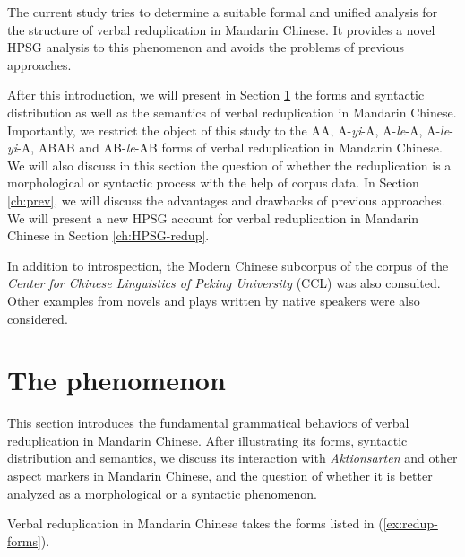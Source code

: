 \documentclass[11pt,a4paper,fleqn,draft]{article}
\begin{document}
The current study tries to determine a suitable formal and unified analysis for the structure of verbal reduplication in Mandarin Chinese.
It provides a novel HPSG analysis to this phenomenon and avoids the problems of previous approaches.

After this introduction, we will present in Section \ref{ch:phen} the forms and syntactic distribution as well as the semantics of verbal reduplication in Mandarin Chinese. 
Importantly, we restrict the object of this study to the AA, A-\emph{yi}-A, A-\emph{le}-A, A-\emph{le}-\emph{yi}-A, ABAB and AB-\emph{le}-AB forms of verbal reduplication in Mandarin Chinese.
We will also discuss in this section the question of whether the reduplication is a morphological or syntactic process with the help of corpus data.
In Section \ref{ch:prev}, we will discuss the advantages and drawbacks of previous approaches. 
We will present a new HPSG account for verbal reduplication in Mandarin Chinese in Section \ref{ch:HPSG-redup}.

In addition to introspection, the Modern Chinese subcorpus of the corpus of the \emph{Center for Chinese Linguistics of Peking University} (CCL) \citep{Zhanetal2003, Zhanetal2019} was also consulted. 
Other examples from novels and plays written by native speakers were also considered.


\section{The phenomenon}\label{ch:phen}

This section introduces the fundamental grammatical behaviors of verbal reduplication in Mandarin Chinese. 
After illustrating its forms, syntactic distribution and semantics, 
we discuss its interaction with \emph{Aktionsarten} and other aspect markers in Mandarin Chinese, 
and the question of whether it is better analyzed as a morphological or a syntactic phenomenon.



Verbal reduplication in Mandarin Chinese takes the forms listed  in (\ref{ex:redup-forms}).
\end{document}
